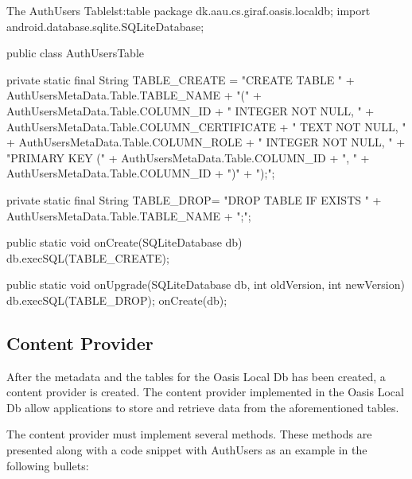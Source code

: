 \begin{Java}{The AuthUsers Table}{lst:table}
package dk.aau.cs.giraf.oasis.localdb;
import android.database.sqlite.SQLiteDatabase;

public class AuthUsersTable {

	private static final String TABLE_CREATE = "CREATE TABLE "
			+ AuthUsersMetaData.Table.TABLE_NAME
			+ "("
			+ AuthUsersMetaData.Table.COLUMN_ID + " INTEGER NOT NULL, "
			+ AuthUsersMetaData.Table.COLUMN_CERTIFICATE + " TEXT NOT NULL, "
			+ AuthUsersMetaData.Table.COLUMN_ROLE + " INTEGER NOT NULL, "
			+ "PRIMARY KEY (" + AuthUsersMetaData.Table.COLUMN_ID + ", " + AuthUsersMetaData.Table.COLUMN_ID + ")"
			+ ");";

	private static final String TABLE_DROP= "DROP TABLE IF EXISTS " + AuthUsersMetaData.Table.TABLE_NAME + ";";

	public static void onCreate(SQLiteDatabase db) {
		db.execSQL(TABLE_CREATE);
	}

	public static void onUpgrade(SQLiteDatabase db, int oldVersion, int newVersion) {
		db.execSQL(TABLE_DROP);
		onCreate(db);
	}
}
\end{Java}

\subsection{Content Provider}
\label{sec:contentProvider}
After the metadata and the tables for the Oasis Local Db has been created, a content provider is created.
The content provider implemented in the Oasis Local Db allow applications to store and retrieve data from the aforementioned tables.

The content provider must implement several methods. These methods are presented along with a code snippet with AuthUsers as an example in the following bullets:

